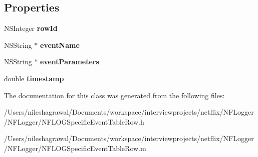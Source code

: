 \subsection*{Properties}
\begin{DoxyCompactItemize}
\item 
\mbox{\label{interface_n_f_l_o_g_specific_event_table_row_a5cc57ae31d37e934175fe16ffe846efe}} 
N\+S\+Integer {\bfseries row\+Id}
\item 
\mbox{\label{interface_n_f_l_o_g_specific_event_table_row_a1b43651cc60d05b8debee3aae041716e}} 
N\+S\+String $\ast$ {\bfseries event\+Name}
\item 
\mbox{\label{interface_n_f_l_o_g_specific_event_table_row_a97e629db826461d4eed06d799e3d7dff}} 
N\+S\+String $\ast$ {\bfseries event\+Parameters}
\item 
\mbox{\label{interface_n_f_l_o_g_specific_event_table_row_a9a826bd6e7bbf4e41d809b09a6b0cd19}} 
double {\bfseries timestamp}
\end{DoxyCompactItemize}


The documentation for this class was generated from the following files\+:\begin{DoxyCompactItemize}
\item 
/\+Users/nileshagrawal/\+Documents/workspace/interviewprojects/netflix/\+N\+F\+Logger/\+N\+F\+Logger/N\+F\+L\+O\+G\+Specific\+Event\+Table\+Row.\+h\item 
/\+Users/nileshagrawal/\+Documents/workspace/interviewprojects/netflix/\+N\+F\+Logger/\+N\+F\+Logger/N\+F\+L\+O\+G\+Specific\+Event\+Table\+Row.\+m\end{DoxyCompactItemize}
